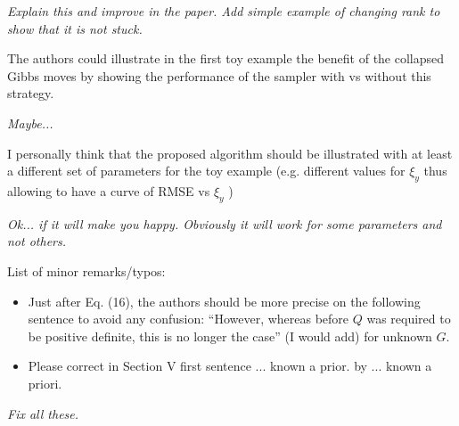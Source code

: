 \documentclass{article}
\newenvironment{review}[0]{\begin{itshape}\color{Gray}\noindent}{\end{itshape}\vspace{0.4cm}}
\newenvironment{response}[0]{\noindent}{\vspace{0.4cm}}
\newcommand{\meta}[1]{{\color{red}\em #1}}
\begin{document}
\begin{response}
 \meta{Explain this and improve in the paper. Add simple example of changing rank to show that it is not stuck.}
\end{response}

\begin{review}
The authors could illustrate in the first toy example the benefit of the collapsed Gibbs
moves by showing the performance of the sampler with vs without this strategy.
\end{review}

\begin{response}
 \meta{Maybe...}
\end{response}

\begin{review}
I personally think that the proposed algorithm should be illustrated with at least a different set of parameters for the toy example (e.g. different values for $\xi_y$ thus allowing to have a curve of RMSE vs $\xi_y$ )
\end{review}

\begin{response}
 \meta{Ok... if it will make you happy. Obviously it will work for some parameters and not others.}
\end{response}

\begin{review}
List of minor remarks/typos:
\begin{itemize}
 \item Just after Eq. (16), the authors should be more precise on the following sentence to avoid any confusion: ``However, whereas before $Q$ was required to be positive definite, this is no longer the case'' (I would add) for unknown $G$.
 \item Please correct in Section V first sentence ... known a prior. by ... known a priori.
\end{itemize}
\end{review}

\begin{response}
 \meta{Fix all these.}
\end{response}
\end{document}
